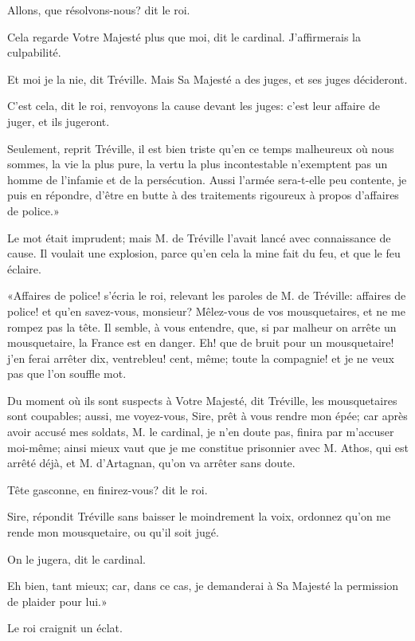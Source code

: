 \speak  Allons, que résolvons-nous? dit le roi. 

\speak  Cela regarde Votre Majesté plus que moi, dit le cardinal. J'affirmerais la culpabilité. 

\speak  Et moi je la nie, dit Tréville. Mais Sa Majesté a des juges, et ses juges décideront. 

\speak  C'est cela, dit le roi, renvoyons la cause devant les juges: c'est leur affaire de juger, et ils jugeront. 

\speak  Seulement, reprit Tréville, il est bien triste qu'en ce temps malheureux où nous sommes, la vie la plus pure, la vertu la plus incontestable n'exemptent pas un homme de l'infamie et de la persécution. Aussi l'armée sera-t-elle peu contente, je puis en répondre, d'être en butte à des traitements rigoureux à propos d'affaires de police.» 

Le mot était imprudent; mais M. de Tréville l'avait lancé avec connaissance de cause. Il voulait une explosion, parce qu'en cela la mine fait du feu, et que le feu éclaire. 

«Affaires de police! s'écria le roi, relevant les paroles de M. de Tréville: affaires de police! et qu'en savez-vous, monsieur? Mêlez-vous de vos mousquetaires, et ne me rompez pas la tête. Il semble, à vous entendre, que, si par malheur on arrête un mousquetaire, la France est en danger. Eh! que de bruit pour un mousquetaire! j'en ferai arrêter dix, ventrebleu! cent, même; toute la compagnie! et je ne veux pas que l'on souffle mot. 

\speak  Du moment où ils sont suspects à Votre Majesté, dit Tréville, les mousquetaires sont coupables; aussi, me voyez-vous, Sire, prêt à vous rendre mon épée; car après avoir accusé mes soldats, M. le cardinal, je n'en doute pas, finira par m'accuser moi-même; ainsi mieux vaut que je me constitue prisonnier avec M. Athos, qui est arrêté déjà, et M. d'Artagnan, qu'on va arrêter sans doute. 

\speak  Tête gasconne, en finirez-vous? dit le roi. 

\speak  Sire, répondit Tréville sans baisser le moindrement la voix, ordonnez qu'on me rende mon mousquetaire, ou qu'il soit jugé. 

\speak  On le jugera, dit le cardinal. 

\speak  Eh bien, tant mieux; car, dans ce cas, je demanderai à Sa Majesté la permission de plaider pour lui.» 

Le roi craignit un éclat. 

